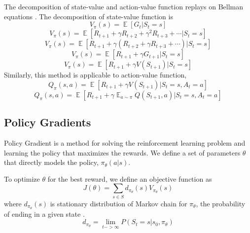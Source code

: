         The decomposition of state-value and action-value function replays on Bellman equations \cite{bellman-eq}. The decomposition of state-value function is
        \begin{equation}
            V_{\pi}(s) = \mathop{\mathbb{E}}[G_t|S_t = s]
        \end{equation}
        \begin{equation}
            V_{\pi}(s) = \mathop{\mathbb{E}}[R_{t+1} + \gamma R_{t+2} + \gamma^2 R_{t+3} + \cdots |S_t = s]
        \end{equation}
        \begin{equation}
            V_{\pi}(s) = \mathop{\mathbb{E}}[R_{t+1} + \gamma(R_{t+2} + \gamma R_{t+3} + \cdots) |S_t = s]
        \end{equation}
        \begin{equation}
            V_{\pi}(s) = \mathop{\mathbb{E}}[R_{t+1} + \gamma G_{t+1} |S_t = s]
        \end{equation}
        \begin{equation}
            V_{\pi}(s) = \mathop{\mathbb{E}}[R_{t+1} + \gamma V(S_{t+1}) |S_t = s]
        \end{equation}
        Similarly, this method is applicable to action-value function,
        \begin{equation}
            Q_{\pi}(s, a) = \mathop{\mathbb{E}}[R_{t+1} + \gamma V(S_{t+1}) |S_t = s, A_t = a]
        \end{equation}
        \begin{equation}
            Q_{\pi}(s, a) = \mathop{\mathbb{E}}[R_{t+1} + \gamma \mathop{\mathbb{E}}_{a \sim \pi} Q(S_{t+1}, a) |S_t = s, A_t = a]
        \end{equation}
    
        \subsection{Policy Gradients}
        Policy Gradient \cite{policy-gradient} is a method for solving the reinforcement learning problem and learning the policy that maximizes the rewards. We define a set of parameters $\theta$ that directly models the policy, $\pi_{\theta}(a|s)$.
    
        To optimize $\theta$ for the best reward, we define an objective function \cite{policy-gradient} as
        \begin{equation}
            J(\theta) = \sum_{s \in S} d_{\pi_{\theta}}(s)V_{\pi_{\theta}}(s)
        \end{equation}
        where $d_{\pi_{\theta}}(s)$ is stationary distribution of Markov chain for $\pi_{\theta}$, the probability of ending in a given state \cite{markov-bullshit}.
        \begin{equation}
            d_{\pi_{\theta}} = \lim_{t -> \infty} P(S_t = s | s_0, \pi_{\theta})
        \end{equation}
        
